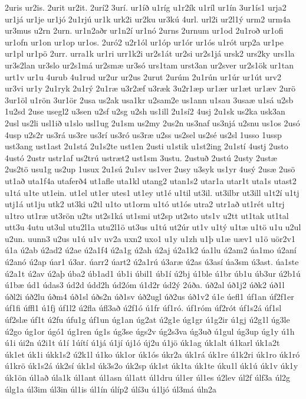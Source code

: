 {2uris
ur2is.
2urit
ur2it.
2urí2
3urí.
ur1íð
u1ríg
u1r2ík
u1ríl
ur1ín
3ur1ís1
urja2
ur1já
ur1je
ur1jó
2u1rjú
ur1k
urk2i
ur2ku
ur3kú
4url.
url2i
ur2l1ý
urm2
urm4a
ur3mus
u2rn
2urn.
ur1n2aðr
ur1n2í
ur1nó
2urns
2urnum
ur1od
2u1roð
ur1ofi
ur1ofn
ur1on
ur1op
ur1os.
2uró2
u2r1ól
ur1óp
ur1ór
ur1ós
u1rót
urp2a
ur1pe
ur1pl
ur1pö
2urr.
urra1k
ur1ri
urr1k2i
ur2s1át
ur2si
ur2s1já
ursk2
urs2ky
urs1la
ur3s2lan
ur3slo
ur2s1má
ur2smæ
ur3só
urs1tam
urst3an
ur2sver
ur2s1ök
ur1tan
urt1v
ur1u
4urub
4u1rud
ur2ur
ur2us
2urut
2urúm
2u1rún
ur1úr
ur1út
urv2
ur3vi
ur1y
2u1ryk
2u1rý
2u1ræ
u3r2æf
u3ræk
3u2r1æp
ur1ær
ur1æt
ur1æv
2urö
3ur1öl
u1rön
3ur1ör
2usa
us2ak
usa1kr
u2sam2e
us1ann
u1sau
3usaæ
u1sá
u2sb
1u2sd
2use
usegl2
u3sen
u2sf
u2sg
u2sh
us1ill
2u1sí2
4usj
2u1sk
us2ka
usk3an
2usl
us2li
usl1ið
u1slo
usl1ug
2u1sm
us2my
2us2n
us3naf
us3njá
u2snu
us1os
2usó
4usp
u2s2r
us3rá
us3re
us3rí
us3ró
us3ræ
u2ss
us2sel
us2sé
us2sl
1usso
1ussp
ust3ang
ust1ast
2u1stá
2u1s2te
ust1en
2usti
u1stik
u1st2ing
2u1stí
4ustj
2usto
4ustó
2ustr
ustr1af
us2trú
ustræt2
ust1sm
3ustu.
2ustuð
2ustú
2usty
2ustæ
2us2tö
usu1g
us2up
1usux
2u1sú
2u1sv
us1ver
2usy
u3syk
us1yr
4usý
2usæ
2usö
ut1að
uta1f4a
utaferð4
ut1afle
uta1kl
utang2
utan1s2
utar1a
utar1t
uta1s
utast2
u1tá
u1te
ut1ein.
ut1el
ut1er
utes1
ut1ey
ut1é
u1til
ut3il.
ut3ilbr
ut3ill
u1t2í
u1tj
utj1á
ut1ju
utk2
ut3ki
u2tl
u1to
ut1orm
u1tó
ut1ós
utra2
utr1að
ut1rét
u1trj
u1tro
ut1ræ
ut3rön
u2ts
ut2s1ká
ut1smi
ut2sp
ut2sto
uts1v
u2tt
ut1tak
ut1tal
utt3u
4utu
ut3ul
utu2l1a
utu2l1ö
ut3us
u1tú
ut2úr
ut1v
u1tý
u1tæ
u1tö
u1u
u2ul
u2un.
uunn3
u2us
u1ú
u1v
uv2a
uxn2
uxo1
u1y
u1zh
u1þ
u1æ
uæv1
u1ö
uör2v1
ú1a
ú2ab
ú2ad2
ú2ae
ú2a1f4
ú2a1g
ú2ah
ú2aj
ú2a1k2
úa1lu
ú2am2
úa1mo
ú2aní
ú2anó
ú2ap
úar1
ú3ar.
úarr2
úart2
ú2a1rú
ú3aræ
ú2as
ú3así
úa3sm
ú3ast.
úa1ste
ú2a1t
ú2av
ú2aþ
úba2
úb1ad1
úb1i
úbil1
úb1í
ú2bj
ú1ble
ú1br
úb1u
úb3ur
ú2b1ú
ú1bæ
úd1
údas3
úd2d
údd2h
úd2óm
ú1d2r
úd2ý
2úða.
úð2al
úð1j2
úðk2
úð1l
úðl2i
úð2lu
úðm4
úð1sl
úðs2n
úð1sv
úð2ugl
úð2us
úð1v2
ú1e
úefl1
úf1an
úf2f1er
úf1fi
úffl1
ú1fj
úf1l2
ú2fla
úfl3að
ú2f1ó
ú1fr
úf1ró.
úf1róm
úf2rót
úf1s2á
úf1sl
úf2slæ
úf1t
ú2fu
úfu1g
úf1un
úg1an
úg2at
ú2g1e
úg1gr
ú1g2ir
ú1gj
ú2g1l
úg3le
ú2go
úg1or
úgó1
úg1ren
úg1s
úg3se
úgs2v
úg2s3va
úg3uð
ú1gul
úg3up
úg1y
ú1h
ú1i
úi2n
ú2i1t
ú1í
1úítí
ú1já
ú1jí
új1ó
új2u
ú1jö
úk1ag
úk1alt
ú1karl
úk1a2t
úk1et
úk1i
úkk1s2
ú2k1l
ú1ko
úk1or
úk1ós
úkr2a
úk1rá
úk1re
ú1k2ri
úk1ro
úk1ró
ú1krö
úk1s2á
úk2sí
úk1sl
úk3s2o
úk2sp
úk1st
úk1ta
úk1te
úku1l
úk1ú
úk1v
úk1y
úk1ön
úl1að
úla1k
úl1ant
úl1asn
úl1att
úl1dru
úl1er
úl1es
ú2lev
úl2f
úlf3a
úl2g
úlg1a
úl3im
úl3in
úl1is
úl1ín
úlíp2
úlí3u
ú1ljó
úl3má
úln2a
}
